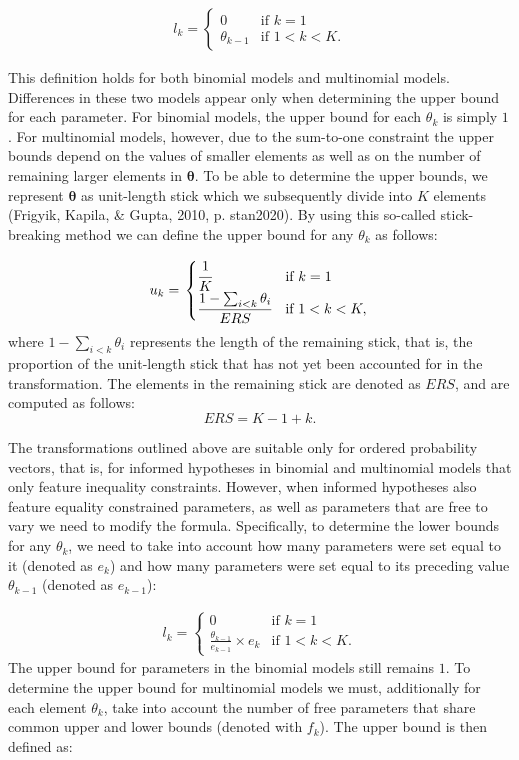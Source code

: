 \begin{appendix}
\begin{align*}
l_k = \left.
\begin{cases}
0 & \text{if } k = 1 \\
\theta_{k - 1} & \text{if } 1 < k < K.
\end{cases}
\right.
\end{align*}

This definition holds for both binomial models and multinomial models.
Differences in these two models appear only when determining the upper
bound for each parameter. For binomial models, the upper bound for each
\(\theta_k\) is simply \(1\). For multinomial models, however, due to
the sum-to-one constraint the upper bounds depend on the values of
smaller elements as well as on the number of remaining larger elements
in \(\boldsymbol{\theta}\). To be able to determine the upper bounds, we
represent \(\boldsymbol{\theta}\) as unit-length stick which we
subsequently divide into \(K\) elements (Frigyik, Kapila, \& Gupta,
2010, p. stan2020). By using this so-called stick-breaking method we can
define the upper bound for any \(\theta_k\) as follows:

\begin{align}
\label{Eq:upperBound}
u_k = \left.
\begin{cases}
\cfrac{1}{K} & \text{if } k = 1 \\
\cfrac{1 - \sum_{i < k} \theta_i}{ERS} & \text{if } 1 < k < K,
\end{cases}
\right.
\end{align} where \(1 - \sum_{i < k} \theta_i\) represents the length of
the remaining stick, that is, the proportion of the unit-length stick
that has not yet been accounted for in the transformation. The elements
in the remaining stick are denoted as \(ERS\), and are computed as
follows: \[ERS = K - 1 + k.\]

The transformations outlined above are suitable only for ordered
probability vectors, that is, for informed hypotheses in binomial and
multinomial models that only feature inequality constraints. However,
when informed hypotheses also feature equality constrained parameters,
as well as parameters that are free to vary we need to modify the
formula. Specifically, to determine the lower bounds for any
\(\theta_k\), we need to take into account how many parameters were set
equal to it (denoted as \(e_k\)) and how many parameters were set equal
to its preceding value \(\theta_{k-1}\) (denoted as \(e_{k-1}\)):

\begin{align}
\label{Eq:lowerBoundAdjusted}
l_k = \left.
\begin{cases}
0 & \text{if } k = 1 \\
\frac{\theta_{k - 1}}{e_{k-1}} \times e_k & \text{if } 1 < k < K.
\end{cases}
\right.
\end{align} The upper bound for parameters in the binomial models still
remains \(1\). To determine the upper bound for multinomial models we
must, additionally for each element \(\theta_k\), take into account the
number of free parameters that share common upper and lower bounds
(denoted with \(f_k\)). The upper bound is then defined as:


\end{appendix}
